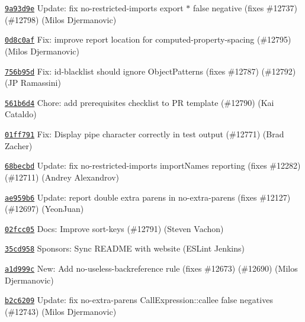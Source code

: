 \begin{DoxyItemize}
\item \href{https://github.com/eslint/eslint/commit/9a93d9ef389c49a133c4df4f9843927f5f806423}{\texttt{ {\ttfamily 9a93d9e}}} Update\+: fix no-\/restricted-\/imports export \texorpdfstring{$\ast$}{*} false negative (fixes \#12737) (\#12798) (Milos Djermanovic)
\item \href{https://github.com/eslint/eslint/commit/0d8c0affe1ae7ecf228cdf91b490921f7e9d1fdb}{\texttt{ {\ttfamily 0d8c0af}}} Fix\+: improve report location for computed-\/property-\/spacing (\#12795) (Milos Djermanovic)
\item \href{https://github.com/eslint/eslint/commit/756b95d59fb97cd9b3f3adf98cebf529fe4842a2}{\texttt{ {\ttfamily 756b95d}}} Fix\+: id-\/blacklist should ignore Object\+Patterns (fixes \#12787) (\#12792) (JP Ramassini)
\item \href{https://github.com/eslint/eslint/commit/561b6d4726f3e77dd40ba0d340ca7f08429cd2eb}{\texttt{ {\ttfamily 561b6d4}}} Chore\+: add prerequisites checklist to PR template (\#12790) (Kai Cataldo)
\item \href{https://github.com/eslint/eslint/commit/01ff7910af86fc45b76e883bc9ab00c9be3b50ac}{\texttt{ {\ttfamily 01ff791}}} Fix\+: Display pipe character correctly in test output (\#12771) (Brad Zacher)
\item \href{https://github.com/eslint/eslint/commit/68becbd84e8a0693409d36f2be10679c483e233a}{\texttt{ {\ttfamily 68becbd}}} Update\+: fix no-\/restricted-\/imports import\+Names reporting (fixes \#12282) (\#12711) (Andrey Alexandrov)
\item \href{https://github.com/eslint/eslint/commit/ae959b691fb148ac8b474c924c8cb01ef61c436d}{\texttt{ {\ttfamily ae959b6}}} Update\+: report double extra parens in no-\/extra-\/parens (fixes \#12127) (\#12697) (Yeon\+Juan)
\item \href{https://github.com/eslint/eslint/commit/02fcc055710e8d69d986f1e682cae2014ad881e2}{\texttt{ {\ttfamily 02fcc05}}} Docs\+: Improve sort-\/keys (\#12791) (Steven Vachon)
\item \href{https://github.com/eslint/eslint/commit/35cd95893be0afd8c954cbcf9268c2aa045b7d5b}{\texttt{ {\ttfamily 35cd958}}} Sponsors\+: Sync README with website (ESLint Jenkins)
\item \href{https://github.com/eslint/eslint/commit/a1d999c6b4e51c317ad409110be7be214ff9f7c6}{\texttt{ {\ttfamily a1d999c}}} New\+: Add no-\/useless-\/backreference rule (fixes \#12673) (\#12690) (Milos Djermanovic)
\item \href{https://github.com/eslint/eslint/commit/b2c62096a8b318765d618cab222240f87d73063b}{\texttt{ {\ttfamily b2c6209}}} Update\+: fix no-\/extra-\/parens Call\+Expression\+::callee false negatives (\#12743) (Milos Djermanovic)

\end{DoxyItemize}
